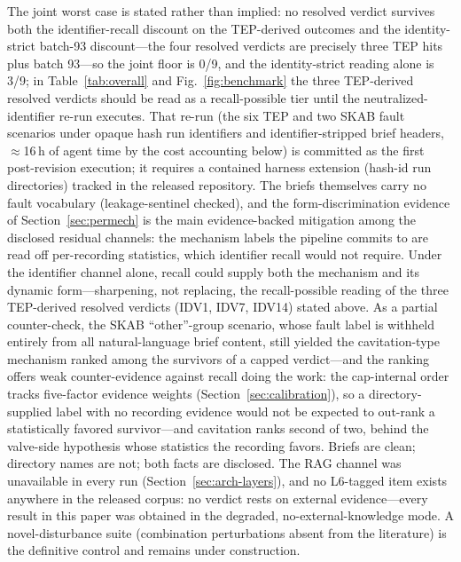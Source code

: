 \documentclass[preprint,12pt]{elsarticle}
\begin{document}
The joint worst case is stated rather than implied: no resolved verdict survives both the identifier-recall discount on the TEP-derived outcomes and the identity-strict batch-93 discount---the four resolved verdicts are precisely three TEP hits plus batch 93---so the joint floor is 0/9, and the identity-strict reading alone is 3/9; in Table~\ref{tab:overall} and Fig.~\ref{fig:benchmark} the three TEP-derived resolved verdicts should be read as a recall-possible tier until the neutralized-identifier re-run executes. That re-run (the six TEP and two SKAB fault scenarios under opaque hash run identifiers and identifier-stripped brief headers, $\approx$16\,h of agent time by the cost accounting below) is committed as the first post-revision execution; it requires a contained harness extension (hash-id run directories) tracked in the released repository. The briefs themselves carry no fault vocabulary (leakage-sentinel checked), and the form-discrimination evidence of Section~\ref{sec:permech} is the main evidence-backed mitigation among the disclosed residual channels: the mechanism labels the pipeline commits to are read off per-recording statistics, which identifier recall would not require. Under the identifier channel alone, recall could supply both the mechanism and its dynamic form---sharpening, not replacing, the recall-possible reading of the three TEP-derived resolved verdicts (IDV1, IDV7, IDV14) stated above. As a partial counter-check, the SKAB ``other''-group scenario, whose fault label is withheld entirely from all natural-language brief content, still yielded the cavitation-type mechanism ranked among the survivors of a capped verdict---and the ranking offers weak counter-evidence against recall doing the work: the cap-internal order tracks five-factor evidence weights (Section~\ref{sec:calibration}), so a directory-supplied label with no recording evidence would not be expected to out-rank a statistically favored survivor---and cavitation ranks second of two, behind the valve-side hypothesis whose statistics the recording favors. Briefs are clean; directory names are not; both facts are disclosed. The RAG channel was unavailable in every run (Section~\ref{sec:arch-layers}), and no L6-tagged item exists anywhere in the released corpus: no verdict rests on external evidence---every result in this paper was obtained in the degraded, no-external-knowledge mode. A novel-disturbance suite (combination perturbations absent from the literature) is the definitive control and remains under construction.
\end{document}
